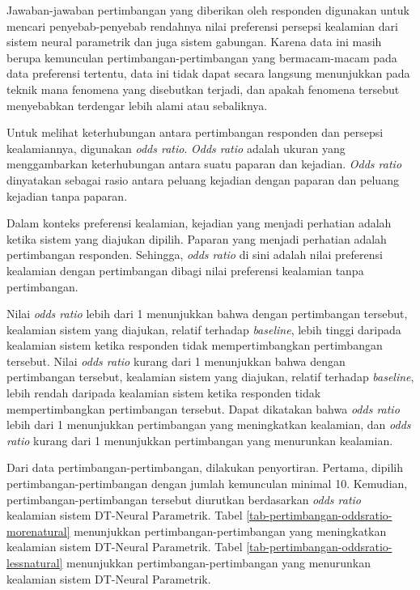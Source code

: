 Jawaban-jawaban pertimbangan yang diberikan oleh responden digunakan untuk mencari penyebab-penyebab rendahnya nilai preferensi persepsi kealamian dari sistem neural parametrik dan juga sistem gabungan. Karena data ini masih berupa kemunculan pertimbangan-pertimbangan yang bermacam-macam pada data preferensi tertentu, data ini tidak dapat secara langsung menunjukkan pada teknik mana fenomena yang disebutkan terjadi, dan apakah fenomena tersebut menyebabkan terdengar lebih alami atau sebaliknya.

Untuk melihat keterhubungan antara pertimbangan responden dan persepsi kealamiannya, digunakan \textit{odds ratio}. \textit{Odds ratio} adalah ukuran yang menggambarkan keterhubungan antara suatu paparan dan kejadian. \textit{Odds ratio} dinyatakan sebagai rasio antara peluang kejadian dengan paparan dan peluang kejadian tanpa paparan. \parencite{oddsratio}

Dalam konteks preferensi kealamian, kejadian yang menjadi perhatian adalah ketika sistem yang diajukan dipilih. Paparan yang menjadi perhatian adalah pertimbangan responden. Sehingga, \textit{odds ratio} di sini adalah nilai preferensi kealamian dengan pertimbangan dibagi nilai preferensi kealamian tanpa pertimbangan.

Nilai \textit{odds ratio} lebih dari 1 menunjukkan bahwa dengan pertimbangan tersebut, kealamian sistem yang diajukan, relatif terhadap \textit{baseline}, lebih tinggi daripada kealamian sistem ketika responden tidak mempertimbangkan pertimbangan tersebut. Nilai \textit{odds ratio} kurang dari 1 menunjukkan bahwa dengan pertimbangan tersebut, kealamian sistem yang diajukan, relatif terhadap \textit{baseline}, lebih rendah daripada kealamian sistem ketika responden tidak mempertimbangkan pertimbangan tersebut. Dapat dikatakan bahwa \textit{odds ratio} lebih dari 1 menunjukkan pertimbangan yang meningkatkan kealamian, dan \textit{odds ratio} kurang dari 1 menunjukkan pertimbangan yang menurunkan kealamian.

Dari data pertimbangan-pertimbangan, dilakukan penyortiran. Pertama, dipilih pertimbangan-pertimbangan dengan jumlah kemunculan minimal 10. Kemudian, pertimbangan-pertimbangan tersebut diurutkan berdasarkan \textit{odds ratio} kealamian sistem DT-Neural Parametrik. Tabel \ref{tab-pertimbangan-oddsratio-morenatural} menunjukkan pertimbangan-pertimbangan yang meningkatkan kealamian sistem DT-Neural Parametrik. Tabel \ref{tab-pertimbangan-oddsratio-lessnatural} menunjukkan pertimbangan-pertimbangan yang menurunkan kealamian sistem DT-Neural Parametrik.

